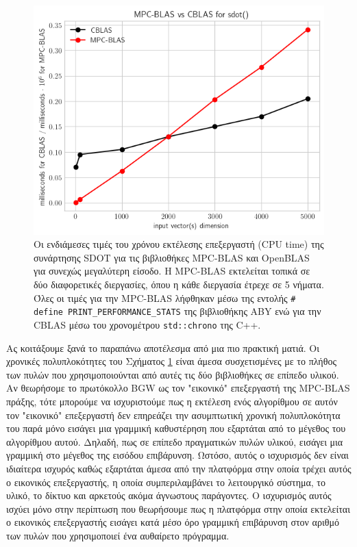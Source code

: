 \begin{figure}[h]
    \centering
    \includegraphics{"./02_postamble/images/mpc-blas-timings-graph.png"}
    \caption{Οι ενδιάμεσες τιμές του χρόνου εκτέλεσης επεξεργαστή (CPU time) της συνάρτησης SDOT για τις βιβλιοθήκες MPC-BLAS και OpenBLAS για συνεχώς μεγαλύτερη είσοδο. Η MPC-BLAS εκτελείται τοπικά σε δύο διαφορετικές διεργασίες, όπου η κάθε διεργασία έτρεχε σε 5 νήματα. Όλες οι τιμές για την MPC-BLAS λήφθηκαν μέσω της εντολής \texttt{# define PRINT_PERFORMANCE_STATS} της βιβλιοθήκης ABY ενώ για την CBLAS μέσω του χρονομέτρου \texttt{std::chrono} της C++.}
    \label{fig:mpc-blas-timings-graph}
\end{figure}

Ας κοιτάξουμε ξανά το παραπάνω αποτέλεσμα από μια πιο πρακτική ματιά. Οι χρονικές πολυπλοκότητες του Σχήματος \ref{fig:mpc-blas-timings-graph} είναι άμεσα συσχετισμένες με το πλήθος των πυλών που χρησιμοποιούνται από αυτές τις δύο βιβλιοθήκες σε επίπεδο υλικού. Αν θεωρήσομε το πρωτόκολλο BGW ως τον "εικονικό" επεξεργαστή της MPC-BLAS πράξης, τότε μπορούμε να ισχυριστούμε πως η εκτέλεση ενός αλγορίθμου σε αυτόν τον "εικονικό" επεξεργαστή δεν επηρεάζει την ασυμπτωτική χρονική πολυπλοκότητα του παρά μόνο εισάγει μια γραμμική καθυστέρηση που εξαρτάται από το μέγεθος του αλγορίθμου αυτού. Δηλαδή, πως σε επίπεδο πραγματικών πυλών υλικού, εισάγει μια γραμμική στο μέγεθος της εισόδου επιβάρυνση. Ωστόσο, αυτός ο ισχυρισμός δεν είναι ιδιαίτερα ισχυρός καθώς εξαρτάται άμεσα από την πλατφόρμα στην οποία τρέχει αυτός ο εικονικός επεξεργαστής, η οποία συμπεριλαμβάνει το λειτουργικό σύστημα, το υλικό, το δίκτυο και αρκετούς ακόμα άγνωστους παράγοντες. Ο ισχυρισμός αυτός ισχύει μόνο στην περίπτωση που θεωρήσουμε πως η πλατφόρμα στην οποία εκτελείται ο εικονικός επεξεργαστής εισάγει κατά μέσο όρο γραμμική επιβάρυνση στον αριθμό των πυλών που χρησιμοποιεί ένα αυθαίρετο πρόγραμμα.